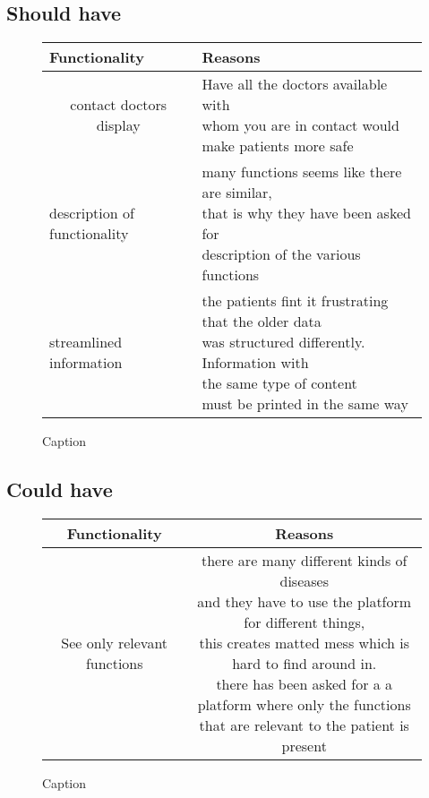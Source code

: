\documentclass[a4paper,11pt]{article}
\begin{document}
\subsection{Should have}

\begin{figure}[H]{\textwidth}
    \centering
    
\begin{tabular}{|l|l|}
\hline
\textbf{Functionality} & \textbf{Reasons} \\\hline                                    
\multicolumn{1}{|c|}{contact doctors display}                 & \makecell{Have all the doctors available with\\ whom you are in contact would \\make patients more safe}                                             \\ \hline
description of functionality                                  & \makecell{many functions seems like there are similar, \\that is why they have been asked for \\description of the various functions}                                   \\ \hline
streamlined information                                       & \makecell{the patients fint it frustrating that the older data\\ was structured differently. Information with\\ the same type of content\\ must be printed in the same way} \\ \hline
\end{tabular}

    \caption{Caption}
    \label{fig:my_label}
\end{figure}{}
\subsection{Could have}

\begin{figure}[H]{\textwidth}
    \centering
    \begin{tabular}{|c|c|}
\hline
\textbf{Functionality} & \textbf{Reasons} \\\hline 
See only relevant functions              & \makecell{there are many different kinds of diseases\\ and they have to use the platform for different things,\\ this creates matted mess which is hard to find around in.\\ there has been asked for a a platform where only the functions\\ that are relevant to the patient is present} \\ \hline
\end{tabular}
    \caption{Caption}
    \label{fig:my_label}
\end{figure}{}
\end{document}
